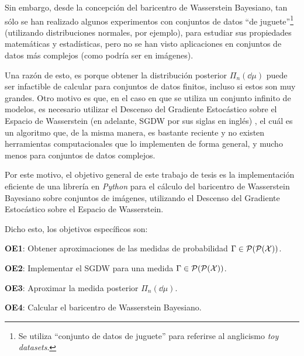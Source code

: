 Sin embargo, desde la concepción del baricentro de Wasserstein Bayesiano, tan sólo se han realizado algunos experimentos con conjuntos de datos ``de juguete''\footnote{Se utiliza ``conjunto de datos de juguete'' para referirse al anglicismo \textit{toy datasets}.} (utilizando distribuciones normales, por ejemplo), para estudiar sus propiedades matemáticas y estadísticas, pero no se han visto aplicaciones en conjuntos de datos más complejos (como podría ser en imágenes).


Una razón de esto, es porque obtener la distribución posterior $\Pi_n(\dd \mu)$ puede ser infactible de calcular para conjuntos de datos finitos, incluso si estos son muy grandes. Otro motivo es que, en el caso en que se utiliza un conjunto infinito de modelos, es necesario utilizar el Descenso del Gradiente Estocástico sobre el Espacio de Wasserstein (en adelante, SGDW por sus siglas en inglés) \cite{backhoff2022stochastic}, el cuál es un algoritmo que, de la misma manera, es bastante reciente y no existen herramientas computacionales que lo implementen de forma general, y mucho menos para conjuntos de datos complejos.

Por este motivo, el objetivo general de este trabajo de tesis es la implementación eficiente de una librería en \emph{Python} para el cálculo del baricentro de Wasserstein Bayesiano sobre conjuntos de imágenes, utilizando el Descenso del Gradiente Estocástico sobre el Espacio de Wasserstein.

Dicho esto, los objetivos específicos son:
\begin{myitemize}
    \item \textbf{OE1}: Obtener aproximaciones de las medidas de probabilidad $\Gamma \in \ProbSpace[\ProbSpace[\cX]]$.
    \item \textbf{OE2}: Implementar el SGDW para una medida $\Gamma \in \ProbSpace[\ProbSpace[\cX]]$.
    \item \textbf{OE3}: Aproximar la medida posterior $\Pi_n(\dd \mu)$.
    \item \textbf{OE4}: Calcular el baricentro de Wasserstein Bayesiano.
\end{myitemize}

